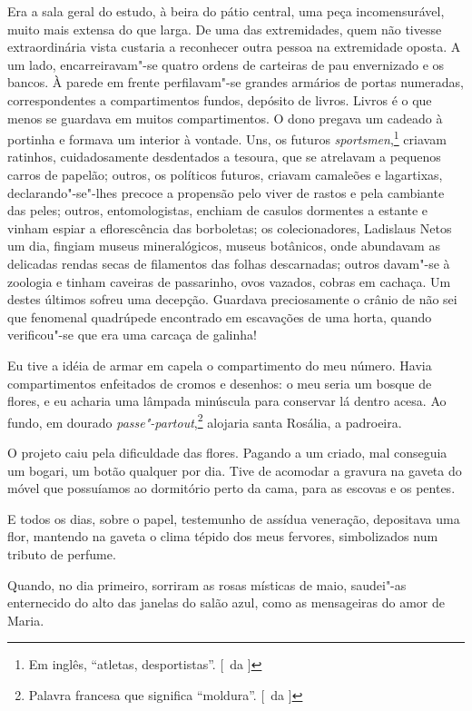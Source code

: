 Era a sala geral do estudo, à beira do pátio central, uma peça
incomensurável, muito mais extensa do que larga. De uma das
extremidades, quem não tivesse extraordinária vista custaria a
reconhecer outra pessoa na extremidade oposta. A um lado,
encarreiravam"-se quatro ordens de carteiras de pau envernizado e os
bancos. À parede em frente perfilavam"-se grandes armários de portas
numeradas, correspondentes a compartimentos fundos, depósito de livros.
Livros é o que menos se guardava em muitos compartimentos. O dono
pregava um cadeado à portinha e formava um interior à vontade. Uns, os
futuros \textit{sportsmen},\footnote{ Em inglês, ``atletas, desportistas''. 
[~da ]} criavam ratinhos, cuidadosamente desdentados a
tesoura, que se atrelavam a pequenos carros de papelão; outros, os
políticos futuros, criavam camaleões e lagartixas,
declarando"-se"-lhes precoce a propensão pelo viver de rastos e pela
cambiante das peles; outros, entomologistas, enchiam de casulos
dormentes a estante e vinham espiar a eflorescência das borboletas; os
colecionadores, Ladislaus Netos um dia, fingiam museus mineralógicos,
museus botânicos, onde abundavam as delicadas rendas secas de
filamentos das folhas descarnadas; outros davam"-se à zoologia e
tinham caveiras de passarinho, ovos vazados, cobras em cachaça. Um
destes últimos sofreu uma decepção. Guardava preciosamente o crânio de
não sei que fenomenal quadrúpede encontrado em escavações de uma horta,
quando verificou"-se que era uma carcaça de galinha! 

Eu tive a idéia
de armar em capela o compartimento do meu número. Havia compartimentos
enfeitados de cromos e desenhos: o meu seria um bosque de flores, e eu
acharia uma lâmpada minúscula para conservar lá dentro acesa. Ao fundo,
em dourado \textit{passe"-partout},\footnote{ Palavra francesa que significa 
``moldura''. [~da ]} alojaria santa Rosália, a padroeira. 


O projeto caiu pela dificuldade das flores. Pagando a um criado, mal
conseguia um bogari, um botão qualquer por dia. Tive de acomodar a
gravura na gaveta do móvel que possuíamos ao dormitório perto da cama,
para as escovas e os pentes. 


E todos os dias, sobre o papel, testemunho
de assídua veneração, depositava uma flor, mantendo na gaveta o clima
tépido dos meus fervores, simbolizados num tributo de perfume. 

Quando, no dia primeiro, sorriram as rosas místicas de maio, saudei"-as
enternecido do alto das janelas do salão azul, como as mensageiras do
amor de Maria. 

